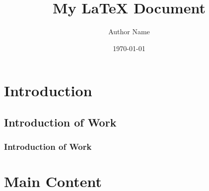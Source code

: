 \documentclass[12pt,a4paper]{article}
\begin{document}
\title{My LaTeX Document}
\author{Author Name}
\date{\today}
\maketitle

\tableofcontents
\newpage

\section{Introduction}
\subsection{Introduction of Work}
\subsubsection{Introduction of Work}


\lipsum[1-2]  %

\newpage
\section{Main Content}
\lipsum[3-5]  %
\end{document}
